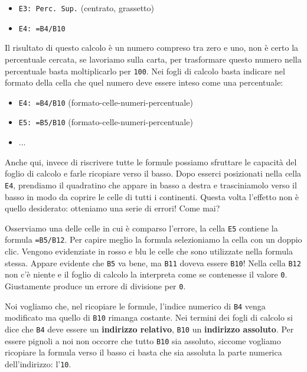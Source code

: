 \begin{itemize}
\item {}
\texttt{E3: Perc. Sup.}
(centrato, grassetto)

\item {}
\texttt{E4: =B4/B10}
\end{itemize}

Il risultato di questo calcolo è un numero compreso tra zero e uno,
non è certo la percentuale cercata,
se lavoriamo sulla carta, per trasformare questo numero nella percentuale
basta moltiplicarlo per \texttt{100}. Nei fogli di calcolo basta indicare nel
formato della cella che quel numero deve essere inteso come una percentuale:

\begin{itemize}
\item {}
\texttt{E4: =B4/B10}
(formato-celle-numeri-percentuale)

\item {}
\texttt{E5: =B5/B10}
(formato-celle-numeri-percentuale)

\item {} 
...
\end{itemize}

Anche qui, invece di riscrivere tutte le formule possiamo sfruttare le
capacità del foglio di calcolo e farle ricopiare verso il basso.
Dopo esserci posizionati nella cella \texttt{E4}, prendiamo il quadratino che
appare in basso a destra e trasciniamolo verso il basso in modo da coprire
le celle di tutti i continenti.
Questa volta l'effetto non è quello desiderato:
otteniamo una serie di errori! Come mai?

Osserviamo una delle celle in cui è comparso l'errore, la cella
\texttt{E5} contiene la formula \texttt{=B5/B12}.
Per capire meglio la formula selezioniamo la cella con un doppio clic.
Vengono evidenziate in rosso e blu le celle che sono utilizzate nella formula
stessa.
Appare evidente che \texttt{B5} va bene, ma \texttt{B11} doveva essere \texttt{B10}!
Nella cella \texttt{B12} non c'è niente e il foglio di calcolo la interpreta
come se contenesse il valore \texttt{0}.
Giustamente produce un errore di divisione per \texttt{0}.

Noi vogliamo che, nel ricopiare le formule, l'indice numerico di \texttt{B4} venga
modificato ma quello di \texttt{B10} rimanga costante.
Nei termini dei fogli di calcolo si dice che \texttt{B4} deve essere un
\textbf{indirizzo relativo}, \texttt{B10} un \textbf{indirizzo assoluto}.
Per essere pignoli a noi non occorre che tutto \texttt{B10} sia assoluto,
siccome vogliamo ricopiare la formula verso il basso ci basta che sia
assoluta la parte numerica dell'indirizzo: l'\texttt{10}.

